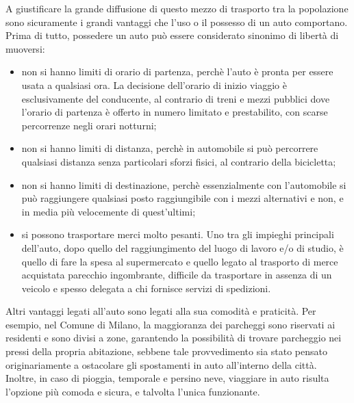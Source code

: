 A giustificare la grande diffusione di questo mezzo di trasporto tra la popolazione sono sicuramente i grandi vantaggi che l'uso o il possesso di un auto comportano. Prima di tutto, possedere un auto può essere considerato sinonimo di libertà di muoversi:
\begin{itemize}
	\item non si hanno limiti di orario di partenza, perchè l'auto è pronta per essere usata a qualsiasi ora. La decisione dell'orario di inizio viaggio è esclusivamente del conducente, al contrario di treni e mezzi pubblici dove l'orario di partenza è offerto in numero limitato e prestabilito, con scarse percorrenze negli orari notturni;
	\item non si hanno limiti di distanza, perchè in automobile si può percorrere qualsiasi distanza senza particolari sforzi fisici, al contrario della bicicletta;
	\item non si hanno limiti di destinazione, perchè essenzialmente con l'automobile si può raggiungere qualsiasi posto raggiungibile con i mezzi alternativi e non, e in media più velocemente di quest'ultimi;
	\item si possono trasportare merci molto pesanti. Uno tra gli impieghi principali dell'auto, dopo quello del raggiungimento del luogo di lavoro e/o di studio, è quello di fare la spesa al supermercato e quello legato al trasporto di merce acquistata parecchio ingombrante, difficile da trasportare in assenza di un veicolo e spesso delegata a chi fornisce servizi di spedizioni.
\end{itemize}
Altri vantaggi legati all'auto sono legati alla sua comodità e praticità. Per esempio, nel Comune di Milano, la maggioranza dei parcheggi sono riservati ai residenti e sono divisi a zone, garantendo la possibilità di trovare parcheggio nei pressi della propria abitazione, sebbene tale provvedimento sia stato pensato originariamente a ostacolare gli spostamenti in auto all'interno della città. Inoltre, in caso di pioggia, temporale e persino neve, viaggiare in auto risulta l'opzione più comoda e sicura, e talvolta l'unica funzionante.
























